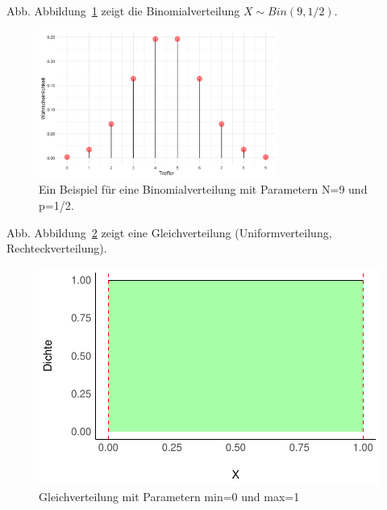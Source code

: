 \documentclass[
  a4paper,
  DIV=11]{scrreprt}
\theoremstyle{definition}
\theoremstyle{remark}
\begin{document}
Abb. Abbildung~\ref{fig-bin-klein} zeigt die Binomialverteilung
\(X \sim Bin(9, 1/2)\).

\begin{figure}

{\centering \includegraphics[width=0.7\textwidth,height=\textheight]{./img/fig-bin-klein.png}

}

\caption{\label{fig-bin-klein}Ein Beispiel für eine Binomialverteilung
mit Parametern N=9 und p=1/2.}

\end{figure}

Abb. Abbildung~\ref{fig-unif} zeigt eine Gleichverteilung
(Uniformverteilung, Rechteckverteilung).

\begin{figure}

{\centering \includegraphics{./Globusversuch_files/figure-pdf/fig-unif-1.pdf}

}

\caption{\label{fig-unif}Gleichverteilung mit Parametern min=0 und
max=1}

\end{figure}
\end{document}
